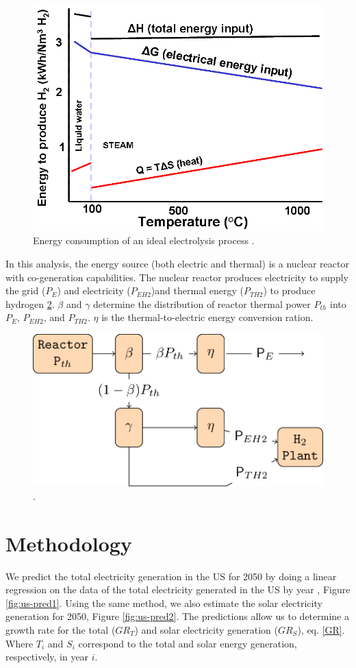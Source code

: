 \documentclass{anstrans}
\begin{document}
\begin{figure}[H]
	\centering
	\includegraphics[width=0.7\linewidth]{figures/ele-heat_curve.png}
	\hfill
	\caption{Energy consumption of an ideal electrolysis process \cite{hi2h2_highly_2007}.}
	\label{fig:electro}
\end{figure}

In this analysis, the energy source (both electric and thermal) is a nuclear reactor with co-generation capabilities.
The nuclear reactor produces electricity to supply the grid ($P_E$) and electricity ($P_{EH2}$)and thermal energy ($P_{TH2}$) to produce hydrogen \ref{fig:h2diag}.
$\beta$ and $\gamma$ determine the distribution of reactor thermal power $P_{th}$ into $P_E$, $P_{EH2}$, and $P_{TH2}$.
$\eta$ is the thermal-to-electric energy conversion ration.

\begin{figure}[H]
	\centering
	\includegraphics[width=0.7\linewidth]{figures/hte-figure0.png}
	\hfill
	\caption{.}
	\label{fig:h2diag}
\end{figure}

\section{Methodology}
\label{method}

We predict the total electricity generation in the \gls{US} for 2050 by doing a linear regression on the data of the total electricity generated in the US by year \cite{us_energy_information_administration_electric_2020}, Figure \ref{fig:us-pred1}.
Using the same method, we also estimate the solar electricity generation for 2050, Figure \ref{fig:us-pred2}.
The predictions allow us to determine a growth rate for the total ($GR_{T}$) and solar electricity generation ($GR_{S}$), eq. \ref{GR}. Where $T_i$ and $S_i$ correspond to the total and solar energy generation, respectively, in year $i$.
\end{document}
